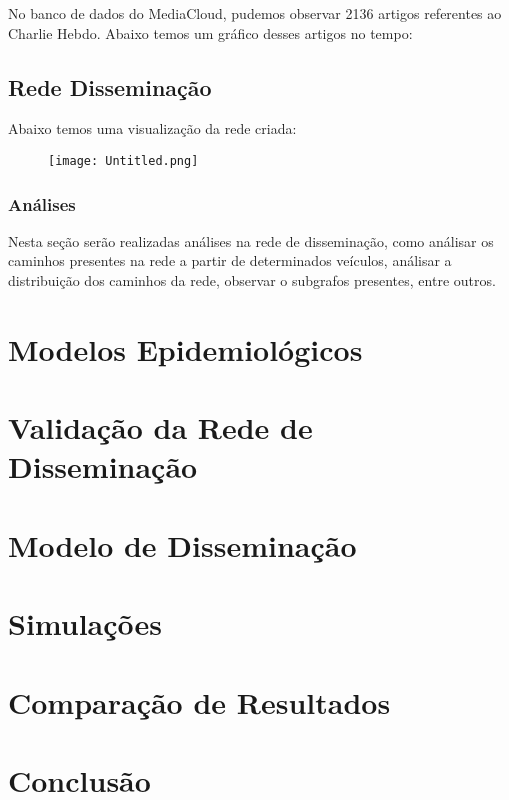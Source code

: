 \documentclass[a4paper,12pt]{article}
\begin{document}
No banco de dados do MediaCloud, pudemos observar 2136 artigos referentes ao Charlie Hebdo. Abaixo temos um gráfico desses artigos
no tempo:

\subsection{Rede Disseminação}

Abaixo temos uma visualização da
 rede criada:

 \begin{figure}[h]
 \centering
 \texttt{[image: Untitled.png]}
\end{figure}

\subsubsection{Análises}

 Nesta seção serão realizadas análises na rede de disseminação, como análisar os caminhos presentes na rede a partir de determinados veículos, análisar
 a distribuição dos caminhos da rede, observar o subgrafos presentes, entre outros.
 
\section{Modelos Epidemiológicos}

\section{Validação da Rede de Disseminação}

\section{Modelo de Disseminação}

\section{Simulações}

\section{Comparação de Resultados}


\section{Conclusão}
\end{document}
